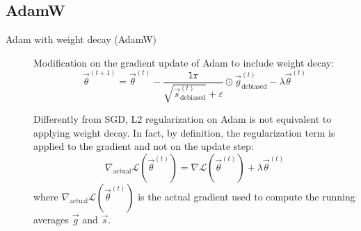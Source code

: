 \subsection{AdamW}

\begin{description}
    \item[Adam with weight decay (AdamW)]  
        Modification on the gradient update of Adam to include weight decay:
        \[ 
            \vec{\theta}^{(t+1)} = \vec{\theta}^{(t)} - \frac{\texttt{lr}}{\sqrt{\vec{s}^{(t)}_{\text{debiased}}} + \varepsilon} \odot \vec{g}^{(t)}_{\text{debiased}} - \lambda\vec{\theta}^{(t)}
        \]

        \begin{remark}
            Differently from SGD, L2 regularization on Adam is not equivalent to applying weight decay. In fact, by definition, the regularization term is applied to the gradient and not on the update step:
            \[ \nabla_{\text{actual}}\mathcal{L}(\vec{\theta}^{(t)}) = \nabla\mathcal{L}(\vec{\theta}^{(t)}) + \lambda\vec{\theta}^{(t)} \]
            where $\nabla_{\text{actual}}\mathcal{L}(\vec{\theta}^{(t)})$ is the actual gradient used to compute the running averages $\vec{g}$ and $\vec{s}$.
        \end{remark}
\end{description}